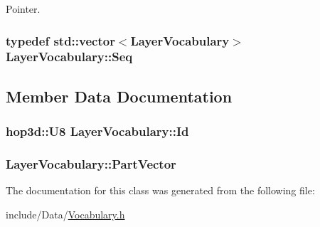 Pointer. 

\hypertarget{class_layer_vocabulary_a6098bd61090934286a749873181b5077}{
\subsubsection[{Seq}]{\setlength{\rightskip}{0pt plus 5cm}typedef std\-::vector$<${\bf Layer\-Vocabulary}$>$ {\bf Layer\-Vocabulary\-::\-Seq}}}\label{class_layer_vocabulary_a6098bd61090934286a749873181b5077}


\subsection{Member Data Documentation}
\hypertarget{class_layer_vocabulary_a6f7881278bd7896751e23ae258bcbcb9}{
\subsubsection[{Id}]{\setlength{\rightskip}{0pt plus 5cm}hop3d\-::\-U8 Layer\-Vocabulary\-::\-Id}}\label{class_layer_vocabulary_a6f7881278bd7896751e23ae258bcbcb9}
\hypertarget{class_layer_vocabulary_a5a33255cbfcdbf3a63fd78a4003bd865}{
\subsubsection[{Part\-Vector}]{ Layer\-Vocabulary\-::\-Part\-Vector}}\label{class_layer_vocabulary_a5a33255cbfcdbf3a63fd78a4003bd865}


The documentation for this class was generated from the following file\-:\begin{DoxyCompactItemize}
\item 
include/\-Data/\hyperlink{_vocabulary_8h}{Vocabulary.\-h}\end{DoxyCompactItemize}
